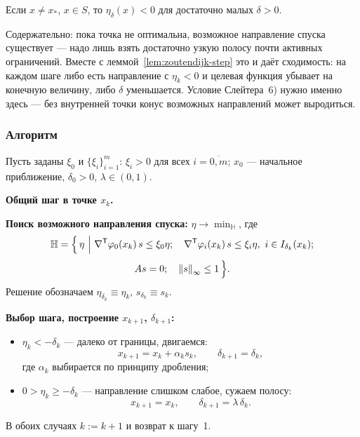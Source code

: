 \begin{theorem}\label{thm:zoutendijk}
Если $x \ne x_*$, $x \in S$, то $\eta_\delta(x) < 0$ для достаточно малых
$\delta > 0$.
\end{theorem}

\begin{idea}
Содержательно: пока точка не оптимальна, возможное направление спуска
существует — надо лишь взять достаточно узкую полосу почти активных
ограничений. Вместе с леммой~\ref{lem:zoutendijk-step} это и даёт сходимость:
на каждом шаге либо есть направление с $\eta_k < 0$ и целевая функция
убывает на конечную величину, либо $\delta$ уменьшается. Условие Слейтера~6)
нужно именно здесь — без внутренней точки конус возможных направлений может
выродиться.
\end{idea}

\subsubsection*{Алгоритм}

Пусть заданы $\xi_0$ и $\{\xi_i\}_{i=1}^{m}$: $\xi_i > 0$ для всех
$i = \overline{0,m}$; $x_0$ — начальное приближение, $\delta_0 > 0$,
$\lambda \in (0,1)$.

\medskip
\noindent\textbf{Общий шаг в точке $x_k$.}

\begin{steps}
  \item \textbf{Поиск возможного направления спуска:}
        $\eta \to \min_{\mathbb{H}}$, где
        \[
          \mathbb{H} = \Big\{\, \eta \ \Big|\
            \nabla^{\mathsf{T}}\varphi_0(x_k)\, s \le \xi_0 \eta ; \quad
            \nabla^{\mathsf{T}}\varphi_i(x_k)\, s \le \xi_i \eta,\ i \in I_{\delta_k}(x_k) ;
        \]
        \[
            A s = 0 ; \quad \left\lVert s \right\rVert_\infty \le 1 \,\Big\} .
        \]
        Решение обозначаем $\eta_{\delta_k} \equiv \eta_k$,
        $s_{\delta_k} \equiv s_k$.
  \item \textbf{Выбор шага, построение $x_{k+1}$, $\delta_{k+1}$:}
        \begin{itemize}[left=0pt,nosep]
          \item[$1^\circ$] $\eta_k < -\delta_k$ — далеко от границы, двигаемся:
                \[
                  x_{k+1} = x_k + \alpha_k s_k , \qquad \delta_{k+1} = \delta_k ,
                \]
                где $\alpha_k$ выбирается по принципу дробления;
          \item[$2^\circ$] $0 > \eta_k \ge -\delta_k$ — направление слишком
                слабое, сужаем полосу:
                \[
                  x_{k+1} = x_k , \qquad \delta_{k+1} = \lambda\,\delta_k .
                \]
        \end{itemize}
        В обоих случаях $k := k+1$ и возврат к шагу~1.
\end{steps}

